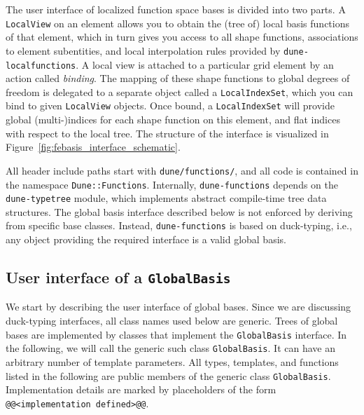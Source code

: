 \documentclass[a4paper,10pt,headings=normal,bibliography=totoc]{scrartcl}
\newcommand{\cpp}[1]{\lstinline[basicstyle=\ttfamily]!#1!}
\newcommand{\dunemodule}[1]{\texttt{#1}}
\newcommand{\todosander}[1]{\todo[inline,color=orange,author=OS]{#1}}
\begin{document}
The user interface of localized function space bases is divided into two parts.  A \cpp{LocalView} on an
element allows you to obtain the (tree of) local basis functions of that element, which in turn gives you access to all
shape functions, associations to element subentities, and local interpolation rules provided by
\dunemodule{dune-localfunctions}.  A local view is attached to a particular grid element by an
action called \emph{binding}.
The mapping of these shape functions to global degrees of freedom is
delegated to a separate object called a \cpp{LocalIndexSet}, which you can bind to given
\cpp{LocalView} objects.  Once bound, a \cpp{LocalIndexSet} will provide global (multi-)indices
for each shape function on this element, and flat indices with respect to the local tree.
The structure of the interface is visualized in
Figure~\ref{fig:febasis_interface_schematic}.

All header include paths
start with \cpp{dune/functions/}, and all code is contained in the namespace \cpp{Dune::Functions}.
Internally, \dunemodule{dune-functions} depends on the \dunemodule{dune-typetree} module,
which implements abstract compile-time tree data structures.
The global basis interface described below is not enforced by deriving
from specific base classes. Instead, \dunemodule{dune-functions} is based on
duck-typing,
\todosander{Referenz}
i.e., any object providing the required
interface is a valid global basis.



\subsection{User interface of a \texorpdfstring{\cpp{GlobalBasis}}{GlobalBasis}}
We start by describing the user interface of global bases.  Since we are discussing duck-typing interfaces,
all class names used below are generic. Trees of global bases are implemented by classes that implement
the \cpp{GlobalBasis} interface. In the following, we will call the generic such class \cpp{GlobalBasis}.
It can have an arbitrary number of template parameters.
All types, templates, and functions listed in the following are public members of
the generic class \cpp{GlobalBasis}. Implementation details are marked
by placeholders of the form \cpp{@@<implementation defined>@@}.
\end{document}
